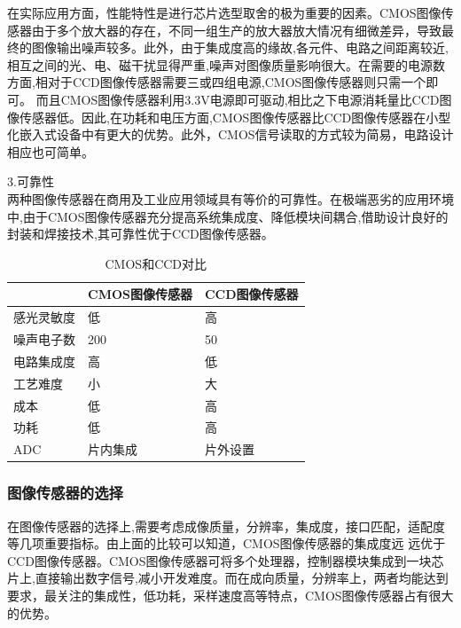在实际应用方面，性能特性是进行芯片选型取舍的极为重要的因素。CMOS图像传感器由于多个放大器的存在，不同一组生产的放大器放大情况有细微差异，导致最终的图像输出噪声较多。此外，由于集成度高的缘故,各元件、电路之间距离较近,相互之间的光、电、磁干扰显得严重,噪声对图像质量影响很大。在需要的电源数方面,相对于CCD图像传感器需要三或四组电源,CMOS图像传感器则只需一个即可。
而且CMOS图像传感器利用3.3V电源即可驱动,相比之下电源消耗量比CCD图像传感器低。因此,在功耗和电压方面,CMOS图像传感器比CCD图像传感器在小型化嵌入式设备中有更大的优势。此外，CMOS信号读取的方式较为简易，电路设计相应也可简单。

3.可靠性\\

两种图像传感器在商用及工业应用领域具有等价的可靠性。在极端恶劣的应用环境中,由于CMOS图像传感器充分提高系统集成度、降低模块间耦合,借助设计良好的封装和焊接技术,其可靠性优于CCD图像传感器。

\begin{table}[htbp]
	\caption{\label{tab:cmosccd}CMOS和CCD对比}
	\centering
 \begin{tabular}{|L{2.2cm}|C{4cm}|R{4cm}|}
\hline
	& CMOS图像传感器 & CCD图像传感器 \\ \hline
	感光灵敏度 & 低 & 高 \\ \hline
	噪声电子数 & 200 & 50 \\ \hline
	电路集成度 & 高 & 低 \\ \hline
	工艺难度 & 小 & 大 \\ \hline
	成本 & 低 & 高 \\ \hline
	功耗 & 低 & 高 \\  \hline
	ADC  & 片内集成  &  片外设置 \\ \hline
 \end{tabular} 
\end{table}

\subsubsection{图像传感器的选择}
在图像传感器的选择上,需要考虑成像质量，分辨率，集成度，接口匹配，适配度等几项重要指标。由上面的比较可以知道，CMOS图像传感器的集成度远
远优于CCD图像传感器。CMOS图像传感器可将多个处理器，控制器模块集成到一块芯片上,直接输出数字信号,减小开发难度。而在成向质量，分辨率上，两者均能达到要求，最关注的集成性，低功耗，采样速度高等特点，CMOS图像传感器占有很大的优势。

